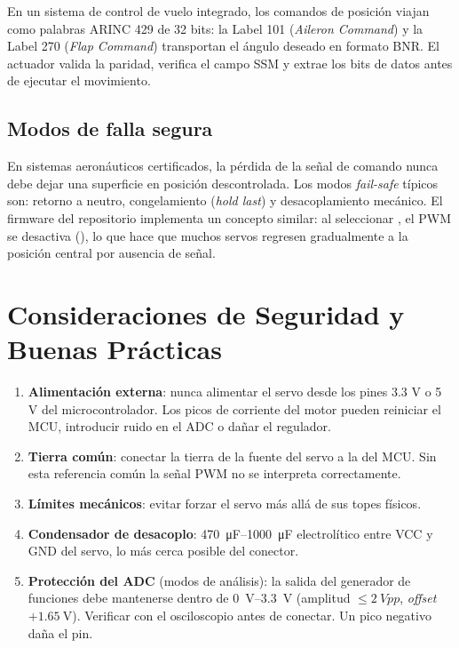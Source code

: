 \documentclass[11pt]{article}
\begin{document}
\begin{nota}
En un sistema de control de vuelo integrado, los comandos de posición viajan como
palabras ARINC 429 de 32 bits: la Label 101 (\emph{Aileron Command}) y la Label 270
(\emph{Flap Command}) transportan el ángulo deseado en formato BNR. El actuador valida
la paridad, verifica el campo SSM y extrae los bits de datos antes de ejecutar el
movimiento.
\end{nota}

\subsection{Modos de falla segura}
En sistemas aeronáuticos certificados, la pérdida de la señal de comando nunca debe
dejar una superficie en posición descontrolada. Los modos \emph{fail-safe} típicos son:
retorno a neutro, congelamiento (\emph{hold last}) y desacoplamiento mecánico. El
firmware del repositorio implementa un concepto similar: al seleccionar , el PWM
se desactiva (), lo que hace que muchos servos regresen gradualmente a la
posición central por ausencia de señal.

\section{Consideraciones de Seguridad y Buenas Prácticas}
\begin{enumerate}
  \item \textbf{Alimentación externa}: nunca alimentar el servo desde los pines 3.3 V o
        5 V del microcontrolador. Los picos de corriente del motor pueden reiniciar el
        MCU, introducir ruido en el ADC o dañar el regulador.
  \item \textbf{Tierra común}: conectar la tierra de la fuente del servo a la del MCU.
        Sin esta referencia común la señal PWM no se interpreta correctamente.
  \item \textbf{Límites mecánicos}: evitar forzar el servo más allá de sus topes físicos.
  \item \textbf{Condensador de desacoplo}: \SIrange{470}{1000}{\micro\farad} electrolítico
        entre VCC y GND del servo, lo más cerca posible del conector.
  \item \textbf{Protección del ADC} (modos de análisis): la salida del generador de
        funciones debe mantenerse dentro de \SIrange{0}{3.3}{\volt} (amplitud
        $\le\SI{2}{Vpp}$, \emph{offset} $+\SI{1.65}{\volt}$). Verificar con el
        osciloscopio antes de conectar. Un pico negativo daña el pin.
\end{enumerate}
\end{document}
